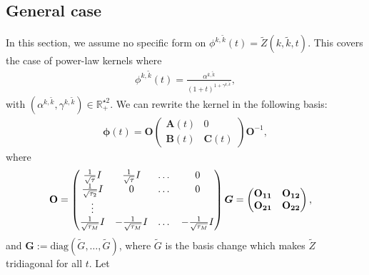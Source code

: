 \documentclass[12pt]{article}
\begin{document}
\subsection{General case}\label{sec_rescaling_general_case}

In this section, we assume no specific form on $\phi^{k,\tilde{k}}(t)= \tilde{Z}(k,\tilde{k},t)$. This covers the case of power-law kernels where 
\begin{align*}
    \phi^{k,\tilde{k}}(t) = \frac{\alpha^{k,\tilde{k}}}{(1+t)^{1+\gamma^{k,\tilde{k}}}},
\end{align*}
with $(\alpha^{k,\tilde{k}},\gamma^{k,\tilde{k}})\in \mathbb{R}^{\star 2}_+$. We can rewrite the kernel in the following basis:
\begin{align*}
       \boldsymbol{\phi}(t) = \mathbf{O} 
   \begin{pmatrix}
    \mathbf{A}(t) & 0 \\
    \mathbf{B}(t) & \mathbf{C}(t)
   \end{pmatrix}
   \mathbf{O}^{-1},
\end{align*}
where 
\begin{align*}
\mathbf{O} &= \begin{pmatrix}
\frac{1}{\sqrt{\tau}}I & \frac{1}{\sqrt{\tau}}I  & \dots & 0 \\
\frac{1}{\sqrt{\tau_2}} I  &  0   & \dots &0  \\
\vdots \\
\frac{1}{\sqrt{\tau_M}}I & -\frac{1}{\sqrt{\tau_M}}I & \dots & -\frac{1}{\sqrt{\tau_M}}I
\end{pmatrix} \boldsymbol{G} = \begin{pmatrix}
 \bf{O_{11}} & \bf{O_{12}} \\
 \bf{O_{21}} & \bf{O_{22}}
\end{pmatrix},
\end{align*}
and $\boldsymbol{G} := \text{diag}(\tilde G, \dots, \tilde G)$, where $\tilde G$ is the basis change which makes $\tilde Z$ tridiagonal for all $t$. Let
\end{document}
